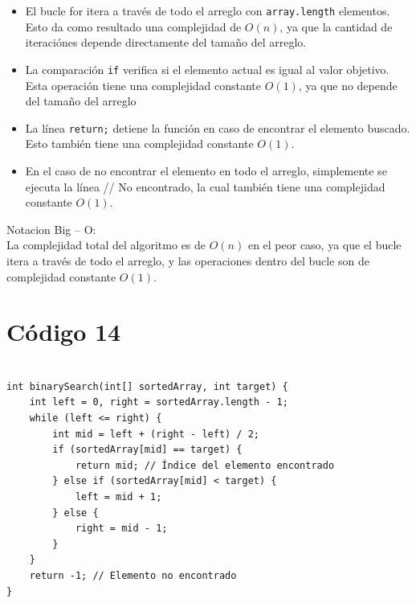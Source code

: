 \documentclass[a4paper,onecolumn,10pt]{article}
\begin{document}
\begin{itemize}

\item El bucle for itera a través de todo el arreglo con \texttt{array.length} elementos. Esto da como resultado una complejidad de $O(n)$, ya que la cantidad de iteraciónes depende directamente del tamaño del arreglo.

\item La comparación \texttt{if}  verifica si el elemento actual es igual al valor objetivo. Esta operación tiene una complejidad constante $O(1)$, ya que no depende del tamaño del arreglo

\item La línea \texttt{return;} detiene la función en caso de encontrar el elemento buscado. Esto también tiene una complejidad constante $O(1)$.

\item En el caso de no encontrar el elemento en todo el arreglo, simplemente se ejecuta la línea // No encontrado, la cual también tiene una complejidad constante $O(1)$.

\end{itemize}

Notacion Big – O:\\

La complejidad total del algoritmo es de $O(n)$ en el peor caso, ya que el bucle itera a través de todo el arreglo, y las operaciones dentro del bucle son de complejidad constante $O(1)$.

\section{Código 14}

\begin{verbatim}
    
int binarySearch(int[] sortedArray, int target) {
    int left = 0, right = sortedArray.length - 1;
    while (left <= right) {
        int mid = left + (right - left) / 2;
        if (sortedArray[mid] == target) {
            return mid; // Índice del elemento encontrado
        } else if (sortedArray[mid] < target) {
            left = mid + 1;
        } else {
            right = mid - 1;
        }
    }
    return -1; // Elemento no encontrado
}

\end{verbatim}
\end{document}
